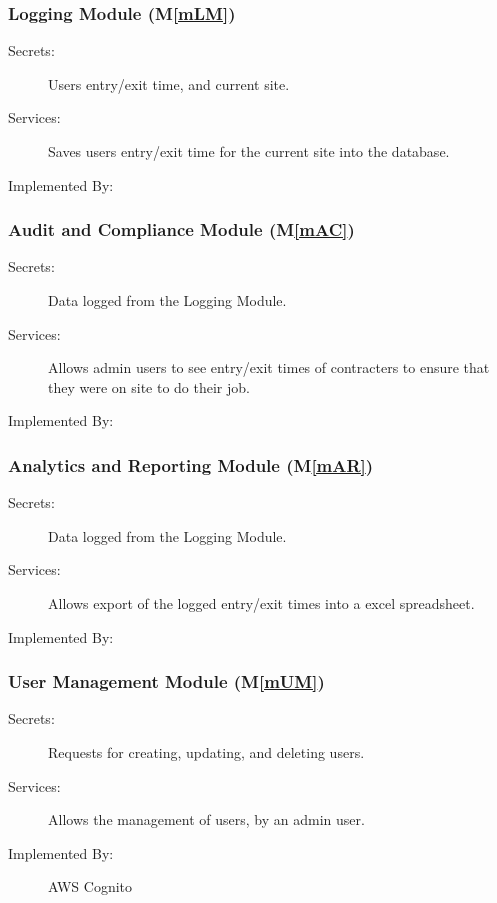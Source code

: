 \documentclass[12pt, titlepage]{article}
\newcommand{\mref}[1]{M\ref{#1}}
\begin{document}
\subsubsection{Logging Module (\mref{mLM})}
\begin{description}
  \item[Secrets:] Users entry/exit time, and current site.
  \item[Services:] Saves users entry/exit time for the current site
    into the database.
  \item[Implemented By:] \progname
\end{description}

\subsubsection{Audit and Compliance Module (\mref{mAC})}

\begin{description}
  \item[Secrets:] Data logged from the Logging Module.
  \item[Services:] Allows admin users to see entry/exit times of
    contracters to ensure that they were on site to do their job.
  \item[Implemented By:] \progname
\end{description}

\subsubsection{Analytics and Reporting Module (\mref{mAR})}
\begin{description}
  \item[Secrets:] Data logged from the Logging Module.
  \item[Services:] Allows export of the logged entry/exit times into
    a excel spreadsheet.
  \item[Implemented By:] \progname
\end{description}

\subsubsection{User Management Module (\mref{mUM})}
\begin{description}
  \item[Secrets:] Requests for creating, updating, and deleting users.
  \item[Services:] Allows the management of users, by an admin user.
  \item[Implemented By:] AWS Cognito
\end{description}
\end{document}
